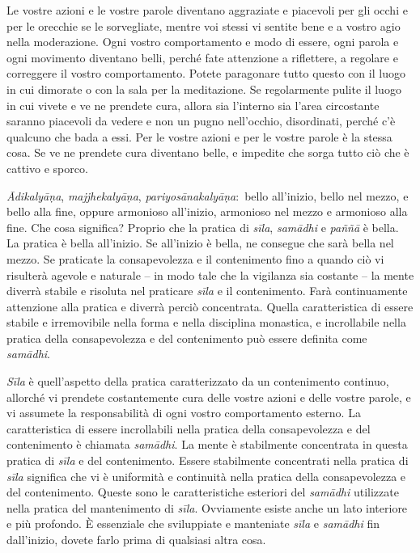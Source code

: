 Le vostre azioni e le vostre parole diventano aggraziate e piacevoli per
gli occhi e per le orecchie se le sorvegliate, mentre voi stessi vi
sentite bene e a vostro agio nella moderazione. Ogni vostro
comportamento e modo di essere, ogni parola e ogni movimento diventano
belli, perché fate attenzione a riflettere, a regolare e correggere il
vostro comportamento. Potete paragonare tutto questo con il luogo in cui
dimorate o con la sala per la meditazione. Se regolarmente pulite il
luogo in cui vivete e ve ne prendete cura, allora sia l'interno sia
l'area circostante saranno piacevoli da vedere e non un pugno
nell'occhio, disordinati, perché c'è qualcuno che bada a essi. Per le
vostre azioni e per le vostre parole è la stessa cosa. Se ve ne prendete
cura diventano belle, e impedite che sorga tutto ciò che è cattivo e
sporco.

\emph{Ādikalyāṇa}, \emph{majjhekalyāṇa}, \emph{pariyosānakalyāṇa}:~bello
all'inizio, bello nel mezzo, e bello alla fine, oppure armonioso
all'inizio, armonioso nel mezzo e armonioso alla fine. Che cosa
significa? Proprio che la pratica di \emph{sīla}, \emph{samādhi} e
\emph{paññā} è bella. La pratica è bella all'inizio. Se all'inizio è
bella, ne consegue che sarà bella nel mezzo. Se praticate la
consapevolezza e il contenimento fino a quando ciò vi risulterà agevole
e naturale -- in modo tale che la vigilanza sia costante -- la mente
diverrà stabile e risoluta nel praticare \emph{sīla} e il contenimento.
Farà continuamente attenzione alla pratica e diverrà perciò concentrata.
Quella caratteristica di essere stabile e irremovibile nella forma e
nella disciplina monastica, e incrollabile nella pratica della
consapevolezza e del contenimento può essere definita come
\emph{samādhi}.

\emph{Sīla} è quell'aspetto della pratica caratterizzato da un
contenimento continuo, allorché vi prendete costantemente cura delle
vostre azioni e delle vostre parole, e vi assumete la responsabilità di
ogni vostro comportamento esterno. La caratteristica di essere
incrollabili nella pratica della consapevolezza e del contenimento è
chiamata \emph{samādhi}. La mente è stabilmente concentrata in questa
pratica di \emph{sīla} e del contenimento. Essere stabilmente
concentrati nella pratica di \emph{sīla} significa che vi è uniformità e
continuità nella pratica della consapevolezza e del contenimento. Queste
sono le caratteristiche esteriori del \emph{samādhi} utilizzate nella
pratica del mantenimento di \emph{sīla}. Ovviamente esiste anche un lato
interiore e più profondo. È essenziale che sviluppiate e manteniate
\emph{sīla} e \emph{samādhi} fin dall'inizio, dovete farlo prima di
qualsiasi altra cosa.


